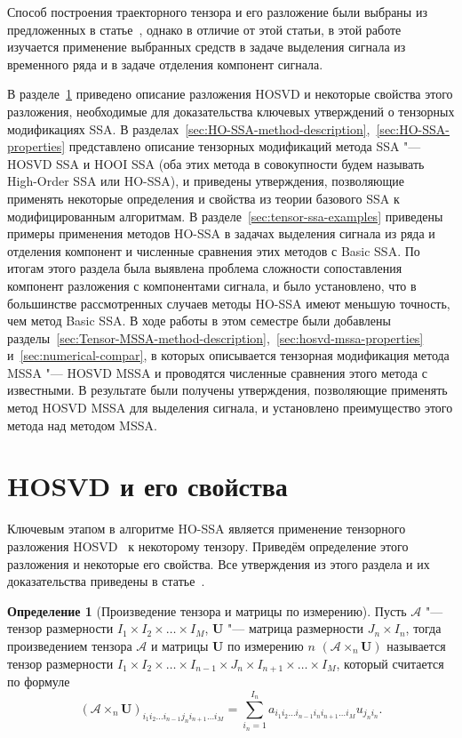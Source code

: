 \documentclass[specialist,
    substylefile = spbu_report.rtx,
    subf,href,colorlinks=true, 12pt]{disser}
\theoremstyle{plain}
\theoremstyle{definition}
\newtheorem{definition}{Определение}[section]
\theoremstyle{remark}
\begin{document}
    Способ построения траекторного тензора и его разложение были выбраны из предложенных в
    статье~\cite{hosvd-hooi-separation}, однако в отличие от этой статьи, в этой работе изучается применение
    выбранных средств в задаче выделения сигнала из временного ряда и в задаче отделения компонент сигнала.

    В разделе~\ref{sec:hosvd} приведено описание разложения HOSVD и некоторые свойства этого разложения,
    необходимые для доказательства ключевых утверждений о тензорных модификациях SSA.
    В разделах~\ref{sec:HO-SSA-method-description},~\ref{sec:HO-SSA-properties} представлено описание
    тензорных модификаций метода SSA "--- HOSVD SSA и HOOI SSA (оба этих метода в совокупности будем называть
    High-Order SSA или HO-SSA), и приведены утверждения, позволяющие применять некоторые определения и
    свойства из теории базового SSA к модифицированным алгоритмам.
    В разделе~\ref{sec:tensor-ssa-examples} приведены примеры применения методов HO-SSA в задачах выделения сигнала
    из ряда и отделения компонент и численные сравнения этих методов с Basic SSA. По итогам этого раздела была
    выявлена проблема сложности сопоставления компонент разложения с компонентами сигнала, и было установлено,
    что в большинстве рассмотренных случаев методы HO-SSA имеют меньшую точность, чем метод Basic SSA.
    В ходе работы в этом семестре были добавлены
    разделы~\ref{sec:Tensor-MSSA-method-description},~\ref{sec:hosvd-mssa-properties} и~\ref{sec:numerical-compar},
    в которых описывается тензорная модификация метода MSSA "--- HOSVD MSSA и проводятся численные сравнения этого метода
    с известными.
    В результате были получены утверждения, позволяющие применять метод HOSVD MSSA для выделения сигнала, и
    установлено преимущество этого метода над методом MSSA.
    \newpage


    \section{HOSVD и его свойства}\label{sec:hosvd}
    Ключевым этапом в алгоритме HO-SSA является применение тензорного разложения HOSVD~\cite{hosvd} к некоторому тензору.
    Приведём определение этого разложения и некоторые его свойства.
    Все утверждения из этого раздела и их доказательства приведены в статье~\cite{hosvd}.

    \begin{definition}[Произведение тензора и матрицы по измерению]
        Пусть $\mathcal A$ "--- тензор размерности $I_1\times I_2\times\ldots\times I_M$, $\mathbf U$
        "--- матрица размерности $J_n\times I_n$, тогда произведением тензора $\mathcal{A}$ и матрицы $\mathbf{U}$ по
        измерению $n$ $(\mathcal{A}\times_n \mathbf U)$ называется тензор размерности $I_1\times I_2\times\ldots\times I_{n-1}
        \times J_n\times I_{n+1}\times \ldots\times I_M$, который считается по формуле
        \[
            (\mathcal{A}\times_n \mathbf U)_{i_1 i_2\ldots i_{n-1}j_n i_{n+1}\ldots i_M} = \sum_{i_n=1}^{I_n} a_{i_1 i_2\ldots
            i_{n-1}i_n i_{n+1} \ldots i_M} u_{j_n i_n}.
        \]
    \end{definition}
\end{document}
